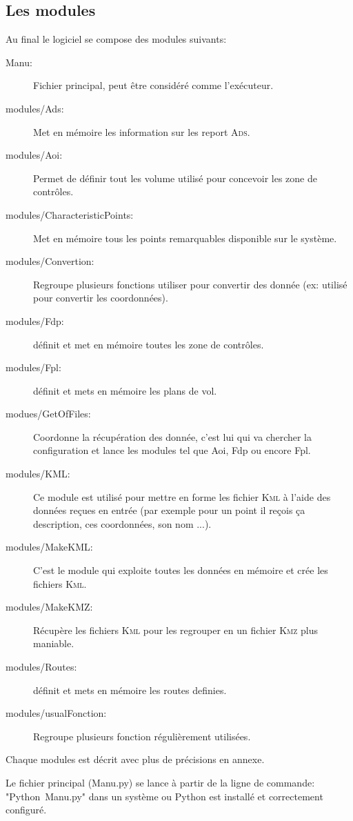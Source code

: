    \subsection{Les modules}
Au final le logiciel se compose des modules suivants:
\begin{description}
\item[Manu:] Fichier principal, peut être considéré comme l'exécuteur. 
\item[modules/Ads:] Met en mémoire les information sur les report \textsc{Ads}. 
\item[modules/Aoi:] Permet de définir tout les volume utilisé pour concevoir les zone de contrôles. 
\item[modules/CharacteristicPoints:] Met en mémoire tous les points remarquables disponible sur le système. 
\item[modules/Convertion:] Regroupe plusieurs fonctions utiliser pour convertir des donnée (ex: utilisé pour convertir les coordonnées). 
\item[modules/Fdp:] définit et met en mémoire toutes les zone de contrôles. 
\item[modules/Fpl:] définit et mets en mémoire les plans de vol. 
\item[modues/GetOfFiles:] Coordonne la récupération des donnée, c'est lui qui va chercher la configuration et lance les modules tel que Aoi, Fdp ou encore Fpl. 
\item[modules/KML:] Ce module est utilisé pour mettre en forme les fichier \textsc{Kml} à l'aide des données reçues en entrée (par exemple pour un point il reçois ça description, ces coordonnées, son nom ...). 
\item[modules/MakeKML:] C'est le module qui exploite toutes les données en mémoire et crée les fichiers \textsc{Kml}. 
\item[modules/MakeKMZ:] Récupère les fichiers \textsc{Kml} pour les regrouper en un fichier \textsc{Kmz} plus maniable. 
\item[modules/Routes:] définit et mets en mémoire les routes definies. 
\item[modules/usualFonction:] Regroupe plusieurs fonction régulièrement utilisées. 
\end{description}
Chaque modules est décrit avec plus de précisions en annexe.

Le fichier principal (Manu.py) se lance à partir de la ligne de commande: "Python~Manu.py" dans un système ou Python est installé et correctement configuré.


